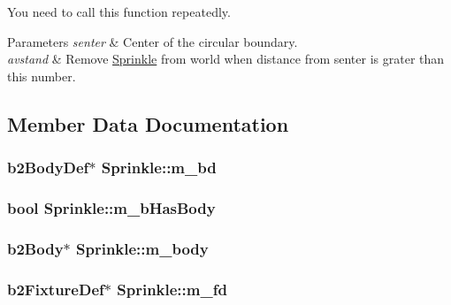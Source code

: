 You need to call this function repeatedly.


\begin{DoxyParams}{Parameters}
{\em senter} & Center of the circular boundary. \\
\hline
{\em avstand} & Remove \hyperlink{classSprinkle}{Sprinkle} from world when distance from senter is grater than this number. \\
\hline
\end{DoxyParams}


\subsection{Member Data Documentation}
\hypertarget{classSprinkle_a6b731943cb16ebafcac7317d905d2304}{
\subsubsection[{m\-\_\-bd}]{\setlength{\rightskip}{0pt plus 5cm}b2\-Body\-Def$\ast$ Sprinkle\-::m\-\_\-bd\hspace{0.3cm}{\ttfamily [private]}}}\label{classSprinkle_a6b731943cb16ebafcac7317d905d2304}
\hypertarget{classSprinkle_ae83f45cf44a02b8cdd3d1093a6649faa}{
\subsubsection[{m\-\_\-b\-Has\-Body}]{\setlength{\rightskip}{0pt plus 5cm}bool Sprinkle\-::m\-\_\-b\-Has\-Body\hspace{0.3cm}{\ttfamily [private]}}}\label{classSprinkle_ae83f45cf44a02b8cdd3d1093a6649faa}
\hypertarget{classSprinkle_a338c8d207f21b49d1da9f93cc093d331}{
\subsubsection[{m\-\_\-body}]{\setlength{\rightskip}{0pt plus 5cm}b2\-Body$\ast$ Sprinkle\-::m\-\_\-body\hspace{0.3cm}{\ttfamily [private]}}}\label{classSprinkle_a338c8d207f21b49d1da9f93cc093d331}
\hypertarget{classSprinkle_ab031f14a73693c0a8a997e03218a7fce}{
\subsubsection[{m\-\_\-fd}]{\setlength{\rightskip}{0pt plus 5cm}b2\-Fixture\-Def$\ast$ Sprinkle\-::m\-\_\-fd\hspace{0.3cm}{\ttfamily [private]}}}\label{classSprinkle_ab031f14a73693c0a8a997e03218a7fce}
